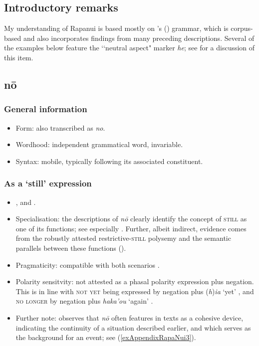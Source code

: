 \subsection{Introductory remarks}
My understanding of Rapanui is based mostly on \citeauthor{Kieviet2017}'s (\citeyear{Kieviet2017}) grammar, which is corpus-based and also incorporates findings from many preceding descriptions. Several of the examples below feature the \lq\lq neutral aspect" marker \textit{he}; see \textcite[316–320]{Kieviet2017} for a discussion of this item.

\subsection{nō}
\subsubsection{General information}
\begin{itemize}
	\item Form: also transcribed as \textit{no}.
	\item Wordhood: independent grammatical word, invariable.
	\item Syntax: mobile, typically following its associated constituent.
\end{itemize}

\subsubsection{As a \lq{}still\rq{ }expression}
\begin{itemize}
	\item \textcite[160]{duFeu1996}, \textcite[132,272]{Fuentes1960} and \textcite[115, 343–344, 347]{Kieviet2017}.
	\item Specialisation: the descriptions of \textit{nō} clearly identify the concept of \textsc{still} as one of its functions; see especially \textcite[115]{Kieviet2017}. Further, albeit indirect, evidence comes from the robustly attested restrictive-\textsc{still} polysemy and the semantic parallels between these functions ().
	\item Pragmaticity: compatible with both scenarios \parencite[344, 347]{Kieviet2017}.
	\item Polarity sensitvity: not attested as a phasal polarity expression plus negation. This is in line with \textsc{not yet} being expressed by negation plus (\textit{h})\textit{ia} \lq yet' \parencite[509]{Kieviet2017}, and \textsc{no longer} by negation plus \textit{haka'ou} \lq again' \parencite[183]{Kieviet2017}.
	 \item Further note: \textcite[322, 344]{Kieviet2017} observes that \textit{nō} often features in texts as a cohesive device, indicating the continuity of a situation described earlier, and which serves as the background for an event; see (\ref{exAppendixRapaNui3}).
\end{itemize}

